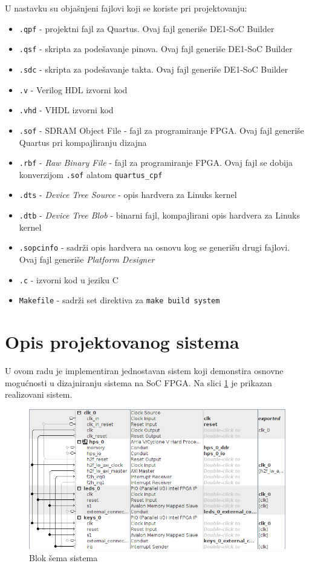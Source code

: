 U nastavku su objašnjeni fajlovi koji se koriste pri projektovanju:
\begin{itemize}
\item \texttt{.qpf} - projektni fajl za Quartus. Ovaj fajl generiše DE1-SoC Builder
\item \texttt{.qsf} - skripta za podešavanje pinova. Ovaj fajl generiše DE1-SoC Builder
\item \texttt{.sdc} - skripta za podešavanje takta. Ovaj fajl generiše DE1-SoC Builder
\item \texttt{.v} - Verilog HDL izvorni kod
\item \texttt{.vhd} - VHDL izvorni kod
\item \texttt{.sof} -  SDRAM Object File - fajl za programiranje FPGA.  Ovaj fajl generiše Quartus pri kompajliranju dizajna
\item \texttt{.rbf} - \textit{Raw Binary File} - fajl za programiranje FPGA. Ovaj fajl se dobija konverzijom \texttt{.sof} alatom \texttt{quartus\_cpf}
\item \texttt{.dts} - \textit{Device Tree Source} - opis hardvera za Linuks kernel
\item \texttt{.dtb} - \textit{Device Tree Blob} - binarni fajl, kompajlirani opis hardvera za Linuks kernel
\item \texttt{.sopcinfo} - sadrži opis hardvera na osnovu kog se generišu drugi fajlovi. Ovaj fajl generiše \textit{Platform Designer}
\item \texttt{.c} - izvorni kod u jeziku C
\item \texttt{Makefile} - sadrži set direktiva za \texttt{make build system}
\end{itemize} 
\pagebreak
\section{Opis projektovanog sistema}

U ovom radu je implementiran jednostavan sistem koji demonstira osnovne mogućnosti u dizajniranju sistema na SoC FPGA. Na slici \ref{slika:q13} je prikazan realizovani sistem.

\begin{figure}[h!]
\centering
\includegraphics[scale=0.9]{img/quartus3.png}
\caption{Blok šema sistema}
\label{slika:q13}
\end{figure}

